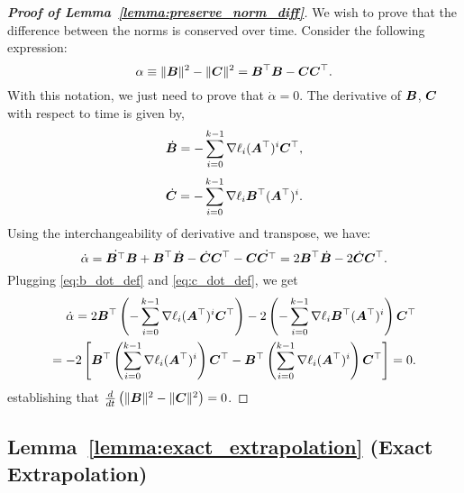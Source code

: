 \begin{proof}[\textbf{Proof of Lemma~\ref{lemma:preserve_norm_diff}}]
We wish to prove that the difference between the norms is conserved over time.
Consider the following expression:
\begin{equation}
    \alpha \equiv \|{\bm{B}}\|^2-\|{\bm{C}}\|^2 = {\bm{B}}^\top {\bm{B}} - {\bm{C}}{\bm{C}}^\top.
\end{equation}
With this notation, we just need to prove that $\dot{\alpha} = 0$.
The derivative of ${\bm{B}}$, ${\bm{C}}$ with respect to time is given by,
\begin{equation}
\label{eq:b_dot_def}
    \dot{{\bm{B}}}=-\sum_{i=0}^{k-1}\nabla \ell_i ({\bm{A}}^\top)^i {\bm{C}}^\top,
\end{equation}
\begin{equation}
\label{eq:c_dot_def}
\dot{{\bm{C}}} = -\sum_{i=0}^{k-1}\nabla \ell_i {\bm{B}}^\top ({\bm{A}}^\top)^i.
\end{equation}
%
Using the interchangeability of derivative and transpose, we have:
%
\begin{equation}
    \dot{\alpha} = \dot{{\bm{B}}^\top}{\bm{B}} + {\bm{B}}^\top \dot{{\bm{B}}} - \dot{{\bm{C}}}{\bm{C}}^\top - {\bm{C}} \dot{{\bm{C}}^\top} = 2{\bm{B}}^\top \dot{{\bm{B}}} -2\dot{{\bm{C}}} {\bm{C}}^\top.
\end{equation}
%
Plugging \eqref{eq:b_dot_def} and \eqref{eq:c_dot_def}, we get
\begin{align}
\dot{\alpha} = 2 {\bm{B}}^\top \left(- \sum_{i=0}^{k-1} \nabla \ell_i ({\bm{A}}^\top)^i {\bm{C}}^\top \right) -2\left(-\sum_{i=0}^{k-1}\nabla \ell_i {\bm{B}}^\top ({\bm{A}}^\top)^i\right) {\bm{C}}^\top \\
    = -2\left[ {\bm{B}}^\top \left( \sum_{i=0}^{k-1} \nabla \ell_i ({\bm{A}}^\top)^i \right){\bm{C}}^\top -{\bm{B}}^\top\left(\sum_{i=0}^{k-1}\nabla \ell_i  ({\bm{A}}^\top)^i\right) {\bm{C}}^\top \right] = 0.
\end{align}
establishing that $\frac{d}{dt}\left(\|{\bm{B}}\|^2-\|{\bm{C}}\|^2\right)=0$.

\end{proof}

\subsection{Lemma~\ref{lemma:exact_extrapolation} (Exact Extrapolation)}\label{sec:exact_extrapolation_proof}


